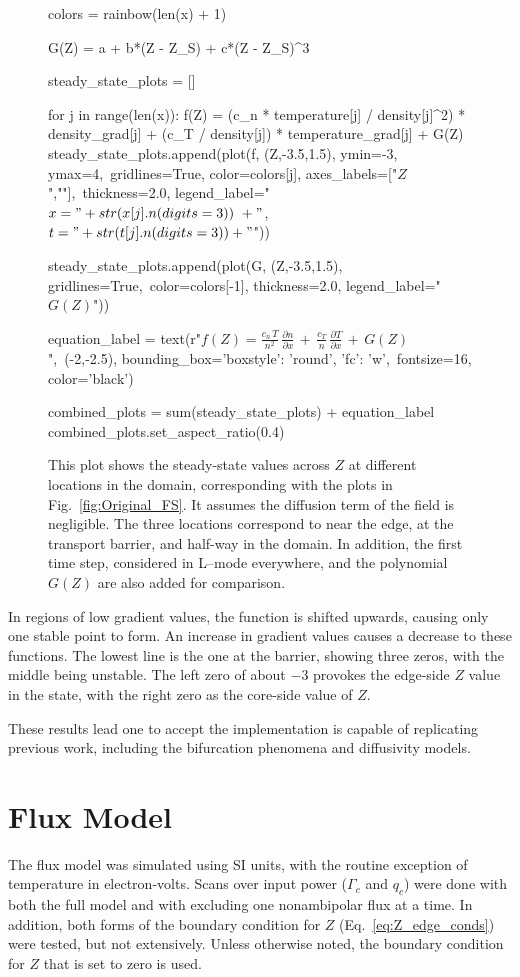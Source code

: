 \begin{figure}[!bt]
\begin{sagesilent}
		colors = rainbow(len(x) + 1)

		G(Z) = a + b*(Z - Z_S) + c*(Z - Z_S)^3

		steady_state_plots = []

		for j in range(len(x)):
		    f(Z) = (c_n * temperature[j] / density[j]^2) * density_grad[j] + (c_T / density[j]) * temperature_grad[j] + G(Z)
		    steady_state_plots.append(plot(f, (Z,-3.5,1.5), ymin=-3, ymax=4,\
		    		gridlines=True, color=colors[j], axes_labels=["$Z$",""],\
		    		thickness=2.0, legend_label="$x = " +str(x[j].n(digits=3))\
		    		+"$, $t = " +str(t[j].n(digits=3))+ "$"))

		steady_state_plots.append(plot(G, (Z,-3.5,1.5), gridlines=True,\
				color=colors[-1], thickness=2.0, legend_label="$G(Z)$"))

		equation_label = text(r"$f(Z) = \frac{c_n \, T}{n^2} \, \frac{\partial n}{\partial x} \,+\, \frac{c_T}{n} \, \frac{\partial T}{\partial x} \,+\, G(Z)$",\
				(-2,-2.5), bounding_box={'boxstyle': 'round', 'fc': 'w'},\
				fontsize=16, color='black')

		combined_plots = sum(steady_state_plots) + equation_label
		combined_plots.set_aspect_ratio(0.4)
	\end{sagesilent}
	\sageplot[width=0.9\textwidth]{combined_plots}
	\caption{This plot shows the steady-state values across $Z$ at different locations in the domain, corresponding with the plots in Fig.~\ref{fig:Original_FS}.
	It assumes the diffusion term of the field is negligible.
	The three locations correspond to near the edge, at the transport barrier, and half-way in the domain.
	In addition, the first time step, considered in L--mode everywhere, and the polynomial $G(Z)$ are also added for comparison.}
	\label{fig:original_stationary_vs_Z}
\end{figure}

In regions of low gradient values, the function is shifted upwards, causing only one stable point to form.
An increase in gradient values causes a decrease to these functions.
The lowest line is the one at the barrier, showing three zeros, with the middle being unstable.
The left zero of about $-3$ provokes the edge-side $Z$ value in the state, with the right zero as the core-side value of $Z$.

These results lead one to accept the implementation is capable of replicating previous work, including the bifurcation phenomena and diffusivity models.

\section{Flux Model} \label{sec:flux_results}
The flux model was simulated using SI units, with the routine exception of temperature in electron-volts.
Scans over input power ($\Gamma_c$ and $q_c$) were done with both the full model and with excluding one nonambipolar flux at a time.
In addition, both forms of the boundary condition for $Z$ (Eq.~\ref{eq:Z_edge_conds}) were tested, but not extensively.
Unless otherwise noted, the boundary condition for $Z$ that is set to zero is used.

